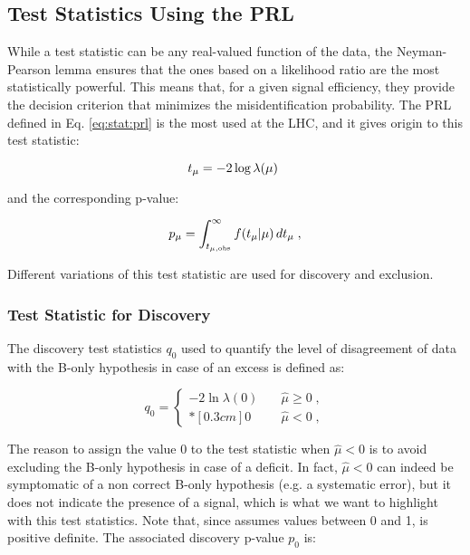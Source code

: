 \subsection{Test Statistics Using the PRL}

While a test statistic can be any real-valued function of the data, the Neyman-Pearson lemma \cite{Neyman} ensures that the ones based on a likelihood ratio are the most statistically powerful. This means that, for a given signal efficiency, they provide the decision criterion that minimizes the misidentification probability. The PRL defined in Eq. \ref{eq:stat:prl} is the most used at the LHC, and it gives origin to this test statistic:

\begin{equation}
\label{eq:stat:tmu}
t_{\mu} = -2 \log \lambda(\mu) \ 
\end{equation}

\noindent and the corresponding p-value:

\begin{equation}
\label{eq:stat:pmu}
p_{\mu} = \int_{t_{\mu,{\rm obs}}}^{\infty} f(t_{\mu} | \mu ) \,
d t_{\mu} \;,
\end{equation}

Different variations of this test statistic are used for discovery and exclusion.

\subsubsection*{Test Statistic for Discovery}

The discovery test statistics $q_{0}$ used to quantify the level of disagreement of data with the B-only hypothesis in case of an excess is defined as:

\begin{equation}
\label{eq:stat:q0}
q_{0} =
\left\{ \! \! \begin{array}{ll}
               - 2 \ln \lambda(0)
               & \quad \hat{\mu} \ge 0 \;, \\*[0.3 cm]
               0 & \quad \hat{\mu} < 0  \;,
              \end{array}
       \right.
\end{equation}
 
\noindent The reason to assign the value 0 to the test statistic when $\hat{\mu} < 0$ is to avoid excluding the B-only hypothesis in case of a deficit. In fact, $\hat{\mu} < 0$ can indeed be symptomatic of a non correct B-only hypothesis (e.g. a systematic error), but it does not indicate the presence of a signal, which is what we want to highlight with this test statistics. Note that, since \prl assumes values between 0 and 1, \qzero is positive definite. The associated discovery p-value $p_{0}$ is:


